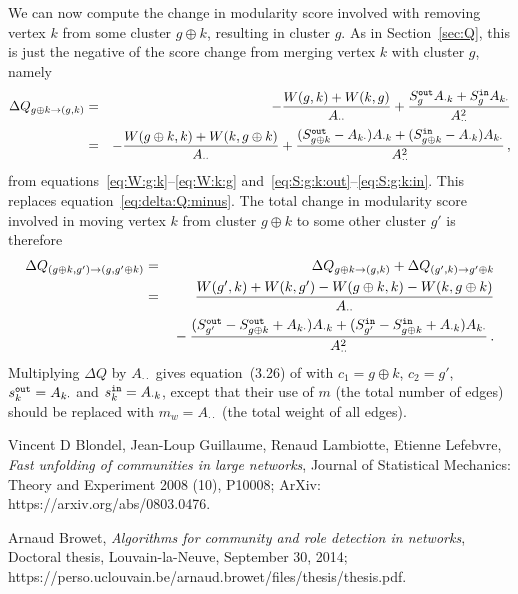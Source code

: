 \documentclass[a4paper]{article}
\begin{document}
We can now compute the change in modularity score involved with removing vertex $k$ from some cluster $g\oplus k$, resulting in cluster $g$.
As in Section~\ref{sec:Q}, this is just the negative of the score change from merging vertex $k$ with cluster $g$, namely
\begin{eqnarray}
    \Delta Q_{g\oplus k\rightarrow (g,k)} & = & 
    -\frac{W(g,k)+W(k,g)}{A_{\cdot\cdot}}+\frac{S_{g}^{\tt out}A_{\cdot k}+S_{g}^{\tt in}A_{k\cdot}}{A_{\cdot\cdot}^2}
\nonumber\\&=&    
    -\frac{W(g\oplus k,k)+W(k,g\oplus k)}{A_{\cdot\cdot}}
    +\frac{(S_{g\oplus k}^{\tt out}-A_{k\cdot})A_{\cdot k}+(S_{g\oplus k}^{\tt in}-A_{\cdot k})A_{k\cdot}}{A_{\cdot\cdot}^2}
\,,
\end{eqnarray}
from equations~\eqref{eq:W:g:k}--\eqref{eq:W:k:g} and~\eqref{eq:S:g:k:out}--\eqref{eq:S:g:k:in}. This replaces equation~\eqref{eq:delta:Q:minus}.
The total change in modularity score involved in moving vertex $k$ from cluster $g\oplus k$ to some other cluster $g'$ is therefore
\begin{eqnarray}
    \Delta Q_{(g\oplus k,g')\rightarrow(g,g'\oplus k)} & = & \Delta Q_{g\oplus k\rightarrow(g,k)} + 
    \Delta Q_{(g',k)\rightarrow g'\oplus k}
\nonumber\\
& = &
\frac{W(g',k)+W(k,g')-W(g\oplus k,k)-W(k,g\oplus k)}{A_{\cdot\cdot}}
\nonumber\\&&
{}-\frac{(S_{g'}^{\tt out}-S_{g\oplus k}^{\tt out}+A_{k\cdot})A_{\cdot k}+(S_{g'}^{\tt in}-S_{g\oplus k}^{\tt in}+A_{\cdot k})A_{k\cdot}}
{A_{\cdot\cdot}^2}
\,.
\end{eqnarray}
Multiplying $\Delta Q$ by $A_{\cdot\cdot}$ gives equation~(3.26) of \cite{browet14}
with $c_1=g\oplus k$, $c_2=g'$, $s_k^{\tt out}=A_{k\cdot}$ and $s_k^{\tt in}=A_{\cdot k}$,
except that their use of $m$ 
(the total number of edges) should be
replaced with $m_w=A_{\cdot\cdot}$ (the total weight of all edges).

\begin{thebibliography}{9}

  Vincent D Blondel, Jean-Loup Guillaume, Renaud Lambiotte, Etienne Lefebvre,
  \textit{Fast unfolding of communities in large networks},
  Journal of Statistical Mechanics: Theory and Experiment 2008 (10), P10008; ArXiv: https://arxiv.org/abs/0803.0476.

  Arnaud Browet,
  \textit{Algorithms for community and role detection in networks},
  Doctoral thesis, Louvain-la-Neuve, September 30, 2014;
  https://perso.uclouvain.be/arnaud.browet/files/thesis/thesis.pdf.

\end{thebibliography}
\end{document}
